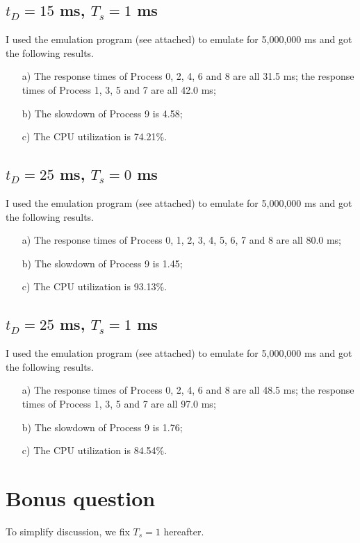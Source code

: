\documentclass[12pt,letterpaper]{article}
\begin{document}
\subsection{$t_D=15$ ms, $T_s = 1$ ms}
I used the emulation program (see attached) to emulate for 5,000,000 ms and got the following results.
\begin{enumerate}
\item[a)] The response times of Process 0, 2, 4, 6 and 8 are all 31.5 ms; the response times of Process 1, 3, 5 and 7 are all 42.0 ms;
\item[b)] The slowdown of Process 9 is 4.58;
\item[c)] The CPU utilization is 74.21\%.
\end{enumerate}

\subsection{$t_D=25$ ms, $T_s = 0$ ms}
I used the emulation program (see attached) to emulate for 5,000,000 ms and got the following results.
\begin{enumerate}
\item[a)] The response times of Process 0, 1, 2, 3, 4, 5, 6, 7 and 8 are all 80.0 ms; 
\item[b)] The slowdown of Process 9 is 1.45;
\item[c)] The CPU utilization is 93.13\%.
\end{enumerate}

\subsection{$t_D=25$ ms, $T_s = 1$ ms}
I used the emulation program (see attached) to emulate for 5,000,000 ms and got the following results.
\begin{enumerate}
\item[a)] The response times of Process 0, 2, 4, 6 and 8 are all 48.5 ms; the response times of Process 1, 3, 5 and 7 are all 97.0 ms;
\item[b)] The slowdown of Process 9 is 1.76;
\item[c)] The CPU utilization is 84.54\%.
\end{enumerate}

\section{Bonus question}
To simplify discussion, we fix $T_s = 1$ hereafter.
\end{document}
